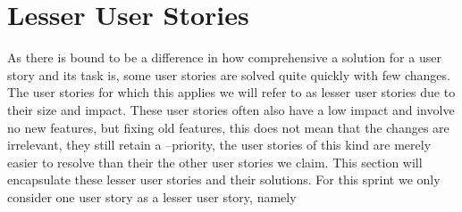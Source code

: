 \section{Lesser User Stories}
As there is bound to be a difference in how comprehensive a solution for a user story and its task is, some user stories are solved quite quickly with few changes.
The user stories for which this applies we will refer to as lesser user stories due to their size and impact.
These user stories often also have a low impact and involve no new features, but fixing old features, this does not mean that the changes are irrelevant, they still retain a \phigh--priority, the user stories of this kind are merely easier to resolve than their the other user stories we claim.
This section will encapsulate these lesser user stories and their solutions.
For this sprint we only consider one user story as a lesser user story, namely 
